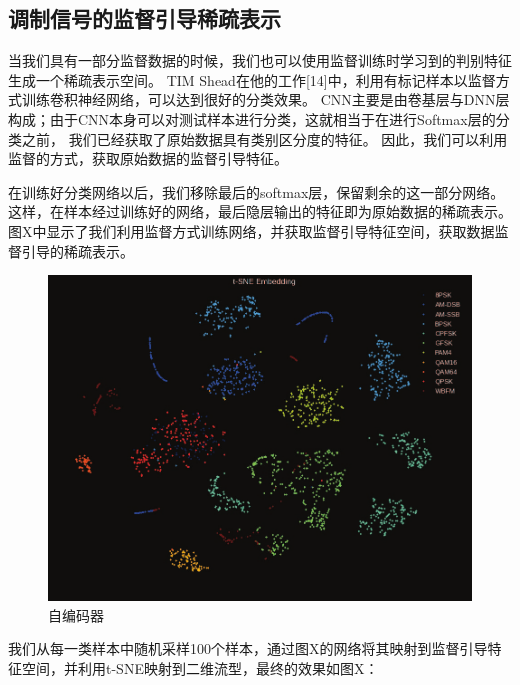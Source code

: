 \subsection{调制信号的监督引导稀疏表示}

当我们具有一部分监督数据的时候，我们也可以使用监督训练时学习到的判别特征生成一个稀疏表示空间。
TIM Shead在他的工作[14]中，利用有标记样本以监督方式训练卷积神经网络，可以达到很好的分类效果。
CNN主要是由卷基层与DNN层构成；由于CNN本身可以对测试样本进行分类，这就相当于在进行Softmax层的分类之前，
我们已经获取了原始数据具有类别区分度的特征。
因此，我们可以利用监督的方式，获取原始数据的监督引导特征。\par

在训练好分类网络以后，我们移除最后的softmax层，保留剩余的这一部分网络。
这样，在样本经过训练好的网络，最后隐层输出的特征即为原始数据的稀疏表示。
图X中显示了我们利用监督方式训练网络，并获取监督引导特征空间，获取数据监督引导的稀疏表示。\par

\begin{figure}[!h]
	\centering
	\includegraphics[scale=0.2]{figures/chapter_3/surprised_fea}
	\caption{自编码器}	\label{sec:fig_3_6}
\end{figure}

我们从每一类样本中随机采样100个样本，通过图X的网络将其映射到监督引导特征空间，并利用t-SNE映射到二维流型，最终的效果如图X：

